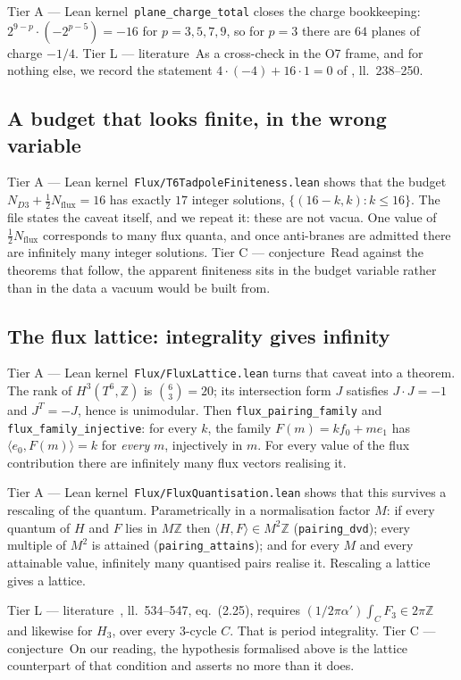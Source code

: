 \documentclass[11pt,a4paper]{article}
\theoremstyle{remark}
\newcommand{\tierA}{\colorbox{green!15}{\textsf{\scriptsize Tier A --- Lean kernel}}}
\newcommand{\tierL}{\colorbox{blue!10}{\textsf{\scriptsize Tier L --- literature}}}
\newcommand{\tierC}{\colorbox{orange!15}{\textsf{\scriptsize Tier C --- conjecture}}}
\newcommand{\lean}[1]{\texttt{#1}}
\begin{document}
\tierA\ \lean{plane\_charge\_total} closes the charge bookkeeping: $2^{9-p}\cdot(-2^{p-5}) = -16$ for
$p = 3,5,7,9$, so for $p = 3$ there are $64$ planes of charge $-1/4$. \tierL\ As a cross-check in the O7 frame,
and for nothing else, we record the statement $4\cdot(-4) + 16\cdot 1 = 0$ of \cite{Sen1996}, ll.~238--250.

\subsection{A budget that looks finite, in the wrong variable}

\tierA\ \lean{Flux/T6TadpoleFiniteness.lean} shows that the budget $N_{D3} + \tfrac{1}{2}N_{\mathrm{flux}} = 16$
has exactly $17$ integer solutions, $\{(16-k,k) : k \le 16\}$. The file states the caveat itself, and we repeat
it: these are not vacua. One value of $\tfrac12 N_{\mathrm{flux}}$ corresponds to many flux quanta, and once
anti-branes are admitted there are infinitely many integer solutions. \tierC\ Read against the theorems that
follow, the apparent finiteness sits in the budget variable rather than in the data a vacuum would be built from.

\subsection{The flux lattice: integrality gives infinity}

\tierA\ \lean{Flux/FluxLattice.lean} turns that caveat into a theorem. The rank of $H^3(T^6,\mathbb{Z})$ is
$\binom{6}{3} = 20$; its intersection form $J$ satisfies $J\!\cdot\!J = -1$ and $J^{T} = -J$, hence is
unimodular. Then \lean{flux\_pairing\_family} and \lean{flux\_family\_injective}: for every $k$, the family
$F(m) = k f_0 + m e_1$ has $\langle e_0, F(m)\rangle = k$ for \emph{every} $m$, injectively in $m$. For every
value of the flux contribution there are infinitely many flux vectors realising it.

\tierA\ \lean{Flux/FluxQuantisation.lean} shows that this survives a rescaling of the quantum. Parametrically in
a normalisation factor $M$: if every quantum of $H$ and $F$ lies in $M\mathbb{Z}$ then
$\langle H,F\rangle \in M^2\mathbb{Z}$ (\lean{pairing\_dvd}); every multiple of $M^2$ is attained
(\lean{pairing\_attains}); and for every $M$ and every attainable value, infinitely many quantised pairs realise
it. Rescaling a lattice gives a lattice.

\tierL\ \cite{GKP2001}, ll.~534--547, eq.~(2.25), requires $(1/2\pi\alpha')\int_C F_3 \in 2\pi\mathbb{Z}$ and
likewise for $H_3$, over every 3-cycle $C$. That is period integrality. \tierC\ On our reading, the hypothesis
formalised above is the lattice counterpart of that condition and asserts no more than it does.
\end{document}
